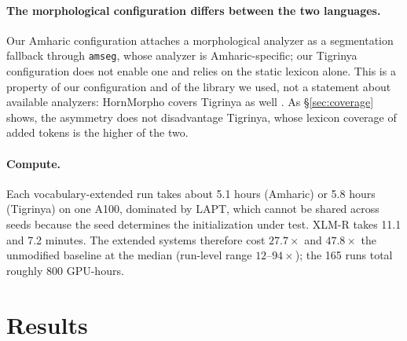 \documentclass[11pt]{article}
\begin{document}
\paragraph{The morphological configuration differs between the two
languages.} Our Amharic configuration attaches a morphological analyzer as a
segmentation fallback through \texttt{amseg}, whose analyzer is
Amharic-specific; our Tigrinya configuration does not enable one and relies
on the static lexicon alone. This is a property of our configuration and of
the library we used, not a statement about available analyzers: HornMorpho
covers Tigrinya as well \citep{gasser-2011-hornmorpho}. As
\S\ref{sec:coverage} shows, the asymmetry does not disadvantage Tigrinya,
whose lexicon coverage of added tokens is the higher of the two.

\paragraph{Compute.} Each vocabulary-extended run takes about 5.1 hours
(Amharic) or 5.8 hours (Tigrinya) on one A100, dominated by LAPT, which
cannot be shared across seeds because the seed determines the initialization
under test. XLM-R takes 11.1 and 7.2 minutes. The extended systems therefore
cost $27.7\times$ and $47.8\times$ the unmodified baseline at the median
(run-level range $12$--$94\times$); the 165 runs total roughly 800
GPU-hours.

\section{Results}
\label{sec:results}
\end{document}
